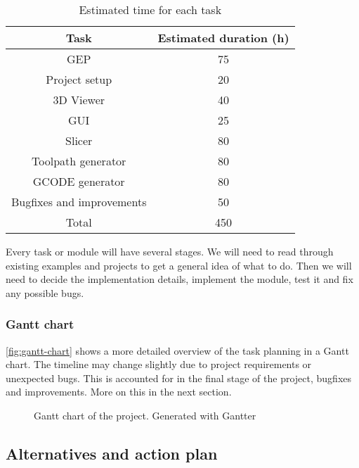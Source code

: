 \FloatBarrier
\begin{table}[h!]
\centering
\begin{tabular}{ |c|c| } 
    \hline
    Task & Estimated duration (h)  \\ 
    \hline
    
    \hline
    GEP & 75  \\ 
    \hline
    Project setup & 20  \\ 
    \hline
    3D Viewer & 40  \\ 
    \hline
    GUI & 25  \\ 
    \hline
    Slicer & 80  \\ 
    \hline
    Toolpath generator & 80  \\ 
    \hline
    GCODE generator & 80  \\ 
    \hline
    Bugfixes and improvements & 50 \\
    
    \hline
    Total & 450 \\
    \hline
\end{tabular}
\caption{Estimated time for each task}\label{table:task-time}
\end{table}
\FloatBarrier


Every task or module will have several stages. We will need to read through existing examples and projects to get a general idea of what to do. Then we will need to decide the implementation details, implement the module, test it and fix any possible bugs.

\subsubsection{Gantt chart}

\autoref{fig:gantt-chart} shows a more detailed overview of the task planning in a Gantt chart. The timeline may change slightly due to project requirements or unexpected bugs. This is accounted for in the final stage of the project, bugfixes and improvements. More on this in the next section.


\begin{figure}[H]
    \noindent{}
    \caption{Gantt chart of the project. Generated with Gantter \cite{gantter}}
    \label{fig:gantt-chart}
\end{figure}


\subsection{Alternatives and action plan}

